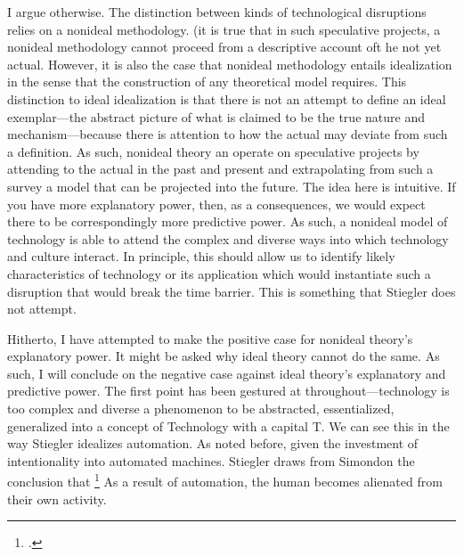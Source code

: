 \documentclass[letterpaper,notitlepage,12pt]{article}
\begin{document}
I argue otherwise.
The distinction between kinds of technological disruptions relies on a nonideal
methodology.
(it is true that in such speculative projects, a nonideal methodology cannot
proceed from a descriptive account oft he not yet actual.
However, it is also the case that nonideal methodology entails idealization in
the sense that the construction of any theoretical model requires.
This distinction to ideal idealization is that there is not an attempt to define
an ideal exemplar---the abstract picture of what is claimed to be the true
nature and mechanism---because there is attention to how the actual may deviate
from such a definition.
As such, nonideal theory an operate on speculative projects by attending to the
actual in the past and present and extrapolating from such a survey a model that
can be projected into the future.
The idea here is intuitive.
If you have more explanatory power, then, as a consequences, we would expect
there to be correspondingly more predictive power.
As such, a nonideal model of technology is able to attend the complex and
diverse ways into which technology and culture interact.
In principle, this should allow us to identify likely characteristics of
technology or its application which would instantiate such a disruption that 
would break the time barrier.
This is something that Stiegler does not attempt.

Hitherto, I have attempted to make the positive case for nonideal theory's
explanatory power.
It might be asked why ideal theory cannot do the same.
As such, I will conclude on the negative case against ideal theory's explanatory
and predictive power.
The first point has been gestured at throughout---technology is too complex and
diverse a phenomenon to be abstracted, essentialized, generalized into a concept
of Technology with a capital T.
We can see this in the way Stiegler idealizes automation.
As noted before, given the investment of intentionality into automated machines.
Stiegler draws from Simondon the conclusion that \footcite[p.
23]{stiegler_technics_1998}
As a result of automation, the human becomes alienated from their own activity.
\end{document}
